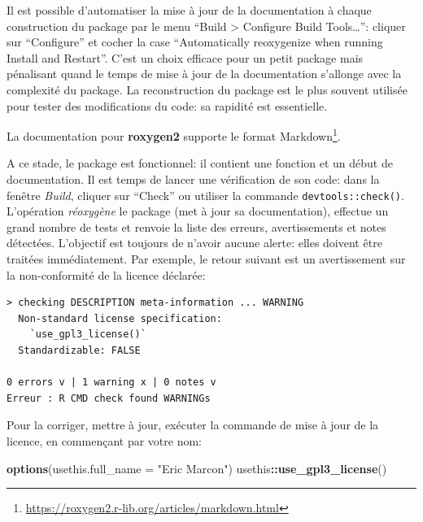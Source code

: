 \documentclass[
  12pt,
  french,
  a4paper,
  extrafontsizes,onecolumn,openright
  ]{memoir}
\newenvironment{Shaded}{\begin{snugshade}}{\end{snugshade}}
\newcommand{\DataTypeTok}[1]{\textcolor[rgb]{0.13,0.29,0.53}{#1}}
\newcommand{\KeywordTok}[1]{\textcolor[rgb]{0.13,0.29,0.53}{\textbf{#1}}}
\newcommand{\NormalTok}[1]{#1}
\newcommand{\OperatorTok}[1]{\textcolor[rgb]{0.81,0.36,0.00}{\textbf{#1}}}
\newcommand{\StringTok}[1]{\textcolor[rgb]{0.31,0.60,0.02}{#1}}
\begin{document}
\normalsize

Il est possible d'automatiser la mise à jour de la documentation à chaque construction du package par le menu \enquote{Build \textgreater{} Configure Build Tools\ldots{}}: cliquer sur \enquote{Configure} et cocher la case \enquote{Automatically reoxygenize when running Install and Restart}.
C'est un choix efficace pour un petit package mais pénalisant quand le temps de mise à jour de la documentation s'allonge avec la complexité du package. La reconstruction du package est le plus souvent utilisée pour tester des modifications du code: sa rapidité est essentielle.

La documentation pour \textbf{roxygen2} supporte le format Markdown\footnote{\url{https://roxygen2.r-lib.org/articles/markdown.html}}.

A ce stade, le package est fonctionnel: il contient une fonction et un début de documentation.
Il est temps de lancer une vérification de son code: dans la fenêtre \emph{Build}, cliquer sur \enquote{Check} ou utiliser la commande \texttt{devtools::check()}.
L'opération \emph{réoxygène} le package (met à jour sa documentation), effectue un grand nombre de tests et renvoie la liste des erreurs, avertissements et notes détectées.
L'objectif est toujours de n'avoir aucune alerte: elles doivent être traitées immédiatement.
Par exemple, le retour suivant est un avertissement sur la non-conformité de la licence déclarée:

\begin{verbatim}
> checking DESCRIPTION meta-information ... WARNING
  Non-standard license specification:
    `use_gpl3_license()`
  Standardizable: FALSE

0 errors v | 1 warning x | 0 notes v
Erreur : R CMD check found WARNINGs
\end{verbatim}

Pour la corriger, mettre à jour, exécuter la commande de mise à jour de la licence, en commençant par votre nom:

\scriptsize

\begin{Shaded}
\begin{Highlighting}[]
\KeywordTok{options}\NormalTok{(}\DataTypeTok{usethis.full_name =} \StringTok{"Eric Marcon"}\NormalTok{)}
\NormalTok{usethis}\OperatorTok{::}\KeywordTok{use_gpl3_license}\NormalTok{()}
\end{Highlighting}
\end{Shaded}

\normalsize
\end{document}
